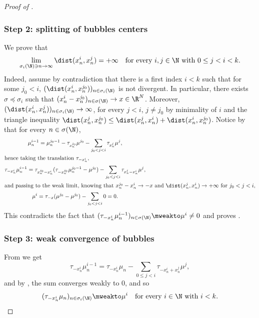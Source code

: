 \begin{proof}[Proof of ]
\subsubsection*{Step 2: splitting of bubbles centers} We prove that
\begin{equation}\label{splittingWeak}
\lim_{\sigma_i(\N) \ni n\to\infty} \dist(x^i_{n},x^j_{n}) =+\infty \quad\text{for every \(i,j\in\N\) with \(0\le j<i<k\)}.
\end{equation}
Indeed, assume by contradiction that there is a first index \(i<k\) such that for some \(j_0<i\), \((\dist(x^i_{n},x^{j_0}_{n}))_{n\in\sigma_i(\N)}\) is not divergent. In particular, there exists \(\sigma\preceq\sigma_i\) such that \((x^i_{n}-x^{j_0}_{n})_{n\in\sigma(\N)}\to x\in\R^N\). Moreover, \((\dist(x^i_n,x^j_n))_{n\in\sigma_i(\N)}\to\infty\), for every \(j<i\), \(j\neq j_0\) by minimality of $i$ and the triangle inequality $\dist(x_n^j,x_n^{j_0}) \leq \dist(x_n^j,x_n^i) + \dist(x_n^i,x_n^{j_0})$. Notice by  that for every $n\in \sigma(\N)$,
\begin{gather*}
\mu_n^{i-1} = \mu_n^{j_0-1} - \tau_{x_n^{j_0}} \mu^{j_0} - \sum_{j_0 < j < i} \tau_{x_n^j} \mu^j,\\
\shortintertext{hence taking the translation $\tau_{-x_n^i}$,}
\tau_{-x_n^i} \mu_n^{i-1} = \tau_{x_n^{j_0}-x_n^i} (\tau_{-x_n^{j_0}} \mu_n^{j_0-1}-\mu^{j_0}) - \sum_{j_0 < j < i} \tau_{x_n^j-x_n^i} \mu^j,\\
\shortintertext{and passing to the weak limit, knowing that $x_n^{j_0}-x_n^i \to -x$ and $\dist(x_n^j,x_n^i) \to +\infty$ for $j_0 < j <i$,}
\mu^i = \tau_{-x}(\mu^{j_0}-\mu^{j_0}) - \sum_{j_0 < j < i} 0 = 0.
\end{gather*}
This contradicts the fact that \((\tau_{-x^i_n}\mu^{i-1}_n)_{n\in\sigma(\N)}\mweakto\mu^i\neq 0\) and proves .

\subsubsection*{Step 3: weak convergence of bubbles}
From  we get\vspace*{-3pt}
\begin{equation}\label{bubbleWeak}
\tau_{-x^i_n}\mu^{i-1}_n =\tau_{-x^i_n}\mu_n-\sum_{0\le j<i}\tau_{-x^i_n+x^j_n}\mu^j,
\end{equation}
and by , the sum converges weakly to $0$, and so\vspace*{-3pt}\enlargethispage{\baselineskip}
\begin{equation}\label{bubbleWeakConvergence}
(\tau_{-x^i_n}\mu_n)_{n\in\sigma_i(\N)}\mweakto \mu^i\quad\text{for every \(i\in\N\) with \(i<k\)}.
\end{equation}


\end{proof}
